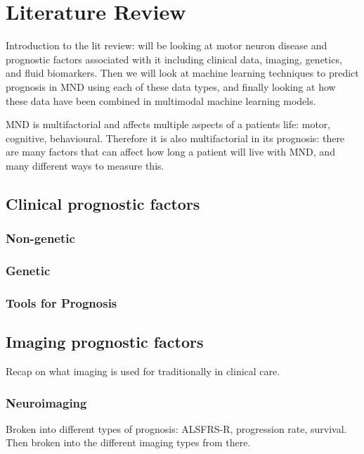 \chapter{Literature Review}
\label{literature_review}

Introduction to the lit review: will be looking at motor neuron disease and prognostic factors associated with it including clinical data, imaging, genetics, and fluid biomarkers.
Then we will look at machine learning techniques to predict prognosis in MND using each of these data types, and finally looking at how these data have been combined in multimodal machine learning models.

MND is multifactorial and affects multiple aspects of a patients life: motor, cognitive, behavioural.
Therefore it is also multifactorial in its prognosis: there are many factors that can affect how long a patient will live with MND, and many different ways to measure this.


\section{Clinical prognostic factors}

\subsection{Non-genetic}

\subsection{Genetic}

\subsection{Tools for Prognosis}

\section{Imaging prognostic factors}

Recap on what imaging is used for traditionally in clinical care.

\subsection{Neuroimaging}

Broken into different types of prognosis: ALSFRS-R, progression rate, survival.
Then broken into the different imaging types from there.

